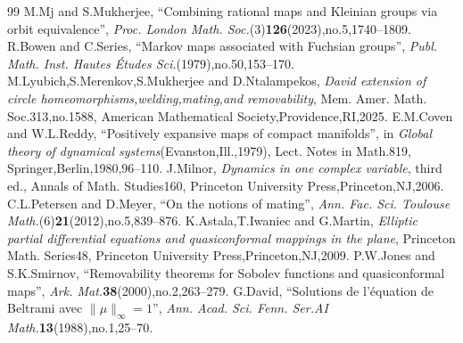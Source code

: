 \documentclass[10pt,a4paper]{amsart}
\theoremstyle{definition}
\theoremstyle{remark}
\begin{document}
\begin{thebibliography}{99}
 M.Mj and S.Mukherjee, ``Combining rational maps and Kleinian groups via orbit equivalence'', \emph{Proc. London Math. Soc.}(3)\textbf{126}(2023),no.5,1740--1809.
 R.Bowen and C.Series, ``Markov maps associated with Fuchsian groups'', \emph{Publ. Math. Inst. Hautes \'Etudes Sci.}(1979),no.50,153--170.
 M.Lyubich,S.Merenkov,S.Mukherjee and D.Ntalampekos, \emph{David extension of circle homeomorphisms,welding,mating,and removability}, Mem. Amer. Math. Soc.313,no.1588, American Mathematical Society,Providence,RI,2025.
 E.M.Coven and W.L.Reddy, ``Positively expansive maps of compact manifolds'', in \emph{Global theory of dynamical systems}(Evanston,Ill.,1979), Lect. Notes in Math.819, Springer,Berlin,1980,96--110.
 J.Milnor, \emph{Dynamics in one complex variable}, third ed., Annals of Math. Studies160, Princeton University Press,Princeton,NJ,2006.
 C.L.Petersen and D.Meyer, ``On the notions of mating'', \emph{Ann. Fac. Sci. Toulouse Math.}(6)\textbf{21}(2012),no.5,839--876.
 K.Astala,T.Iwaniec and G.Martin, \emph{Elliptic partial differential equations and quasiconformal mappings in the plane}, Princeton Math. Series48, Princeton University Press,Princeton,NJ,2009.
 P.W.Jones and S.K.Smirnov, ``Removability theorems for Sobolev functions and quasiconformal maps'', \emph{Ark. Mat.}\textbf{38}(2000),no.2,263--279.
 G.David, ``Solutions de l'équation de Beltrami avec $\|\mu\|_\infty=1$'', \emph{Ann. Acad. Sci. Fenn. Ser.AI Math.}\textbf{13}(1988),no.1,25--70.
\end{thebibliography}
\end{document}
